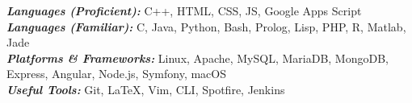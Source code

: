 

\begin{cvparagraph}
  \textbf{\textit{Languages (Proficient): }} C++, HTML, CSS, JS, Google Apps Script\\
  \textbf{\textit{Languages (Familiar): }}C, Java, Python, Bash, Prolog, Lisp, PHP, R, Matlab, Jade \\
  \textbf{\textit{Platforms \& Frameworks: }}Linux, Apache, MySQL, MariaDB, MongoDB, Express, Angular, Node.js, Symfony, macOS \\
  \textbf{\textit{Useful Tools: }}Git, \LaTeX, Vim, CLI, Spotfire, Jenkins
\end{cvparagraph}
